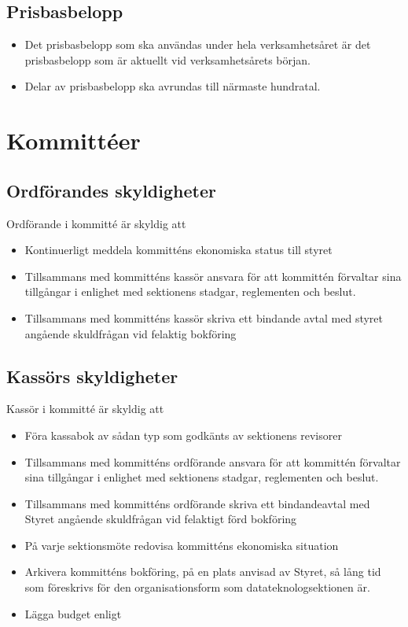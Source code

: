 \documentclass[a4paper]{dtek}
\begin{document}
\subsection{Prisbasbelopp}
\begin{itemize}
  \item Det prisbasbelopp som ska användas under hela verksamhetsåret är det prisbasbelopp som är aktuellt vid verksamhetsårets början.
  \item Delar av prisbasbelopp ska avrundas till närmaste hundratal.
\end{itemize}
\section{Kommittéer}
\label{sec:kommitteer}

\subsection{Ordförandes skyldigheter}
Ordförande i kommitté är skyldig att
\begin{itemize}
\item Kontinuerligt meddela kommitténs ekonomiska status till styret
\item Tillsammans med kommitténs kassör ansvara för att kommittén förvaltar sina tillgångar i enlighet med sektionens stadgar, reglementen och beslut.
\item Tillsammans med kommitténs kassör skriva ett bindande avtal med styret angående skuldfrågan vid felaktig bokföring
\end{itemize}
\subsection{Kassörs skyldigheter}
\label{sec:kommittee_kassor}
Kassör i kommitté är skyldig att
\begin{itemize}
\item Föra kassabok av sådan typ som godkänts av sektionens revisorer
\item Tillsammans med kommitténs ordförande ansvara för att kommittén förvaltar sina tillgångar i enlighet med sektionens stadgar, reglementen och beslut.
\item Tillsammans med kommitténs ordförande skriva ett bindandeavtal med Styret angående skuldfrågan vid felaktigt förd bokföring
\item På varje sektionsmöte redovisa kommitténs ekonomiska situation
\item Arkivera kommitténs bokföring, på en plats anvisad av Styret, så lång tid som föreskrivs för den organisationsform som datateknologsektionen är.
\item Lägga budget enligt 
\end{itemize}
\end{document}
